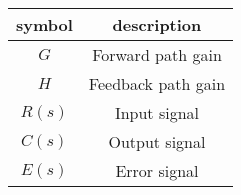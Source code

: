 
\begin{tabular}{|c|c|}
	\hline
	\textbf{symbol} & \textbf{description} \\
	\hline
	$G$ & Forward path gain\\
	\hline
	$H$ & Feedback path gain\\
	\hline
	$R(s)$ & Input signal \\
	\hline
	$C(s)$ & Output signal \\
	\hline
	$E(s)$ & Error signal \\
	\hline
\end{tabular}